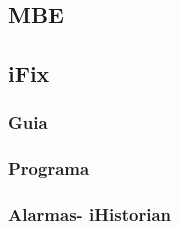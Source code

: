 

\subsection{MBE}
\subsection{iFix}
\subsubsection{Guia}
\subsubsection{Programa}


\subsubsection{Alarmas- iHistorian}